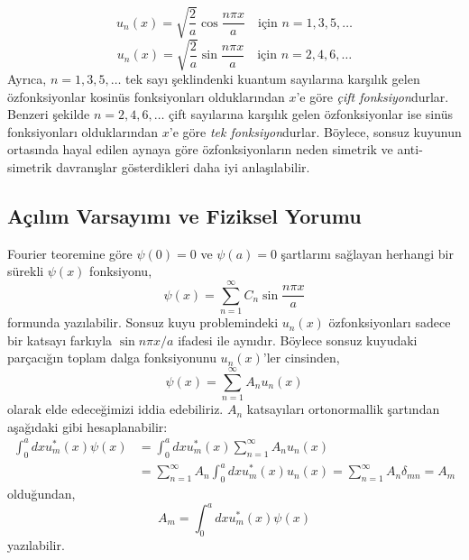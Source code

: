 \documentclass[00_kitap.tex]{subfiles}
\begin{document}
\begin{enumerate}
	\begin{equation}
	u _ { n } ( x ) = \sqrt { \frac { 2 } { a } } \cos \frac { n \pi x } { a } \quad \text {için } n = 1,3,5 , \dots
	\end{equation}
	\begin{equation}
	u _ { n } ( x ) = \sqrt { \frac { 2 } { a } } \sin \frac { n \pi x } { a } \quad \text{için } n = 2,4,6, \dots
	\end{equation}
	Ayrıca, $n = 1,3,5, \dots$ tek sayı şeklindenki kuantum sayılarına karşılık gelen özfonksiyonlar kosinüs fonksiyonları olduklarından $x$'e göre \emph{çift fonksiyon}durlar. Benzeri şekilde $n = 2,4,6, \dots$ çift sayılarına karşılık gelen özfonksiyonlar ise sinüs fonksiyonları olduklarından  $x$'e göre \emph{tek fonksiyon}durlar. Böylece, sonsuz kuyunun ortasında hayal edilen aynaya göre özfonksiyonların neden simetrik ve anti-simetrik davranışlar gösterdikleri daha iyi anlaşılabilir.

	
\end{enumerate}




\subsection{Açılım Varsayımı ve Fiziksel Yorumu }

Fourier teoremine göre $\psi ( 0 ) = 0$ ve $\psi ( a ) = 0$ şartlarını sağlayan herhangi bir sürekli $\psi ( x )$ fonksiyonu,
\begin{equation}
\psi ( x ) = \sum _ { n = 1 } ^ { \infty } C _ { n } \sin \frac { n \pi x } { a }
\end{equation}
formunda yazılabilir. Sonsuz kuyu problemindeki $u_n(x)$ özfonksiyonları sadece bir katsayı farkıyla $\sin n \pi x / a$ ifadesi ile aynıdır. Böylece sonsuz kuyudaki parçacığın toplam dalga fonksiyonunu $u_n(x)$'ler cinsinden,
\begin{equation}
\psi ( x ) = \sum _ { n = 1 } ^ { \infty } A _ { n } u _ { n } ( x )
\end{equation}
olarak elde edeceğimizi iddia edebiliriz. $A_n$ katsayıları ortonormallik şartından aşağıdaki gibi hesaplanabilir:
\begin{equation}
\begin{aligned} \int _ { 0 } ^ { a } d x u _ { m } ^ { * } ( x ) \psi ( x ) & = \int _ { 0 } ^ { a } d x u _ { m } ^ { * } ( x ) \sum _ { n = 1 } ^ { \infty } A _ { n } u _ { n } ( x ) \\ & = \sum _ { n = 1 } ^ { \infty } A _ { n } \int _ { 0 } ^ { a } d x u _ { m } ^ { * } ( x ) u _ { n } ( x ) = \sum _ { n = 1 } ^ { \infty } A _ { n } \delta _ { m n } = A _ { m } \end{aligned}
\end{equation}
olduğundan,
\begin{equation}
A _ { m } = \int _ { 0 } ^ { a } d x u _ { m } ^ { * } ( x ) \psi ( x )
\end{equation}
yazılabilir.
\end{document}
